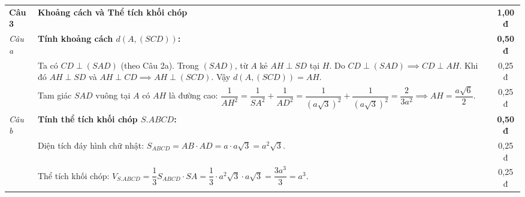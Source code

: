 \documentclass[12pt, a4paper]{article}
\begin{document}
\begin{center}
\begin{tabularx}{\textwidth}{|p{1.5cm}|X|c|}
\textbf{Câu 3} & \textbf{Khoảng cách và Thể tích khối chóp} & \textbf{1,00 đ} \\ \cline{2-3}
\textit{Câu a} & \textbf{Tính khoảng cách $d(A, (SCD))$:} & \textbf{0,50 đ} \\ \cline{2-3}
 & Ta có $CD \perp (SAD)$ (theo Câu 2a). Trong $(SAD)$, từ $A$ kẻ $AH \perp SD$ tại $H$.\newline
 Do $CD \perp (SAD) \implies CD \perp AH$. Khi đó $AH \perp SD$ và $AH \perp CD \implies AH \perp (SCD)$. Vậy $d(A, (SCD)) = AH$. & 0,25 đ \\ \cline{2-3}
 & Tam giác $SAD$ vuông tại $A$ có $AH$ là đường cao:\newline
 $\dfrac{1}{AH^2} = \dfrac{1}{SA^2} + \dfrac{1}{AD^2} = \dfrac{1}{(a\sqrt{3})^2} + \dfrac{1}{(a\sqrt{3})^2} = \dfrac{2}{3a^2} \implies AH = \dfrac{a\sqrt{6}}{2}$. & 0,25 đ \\ \cline{2-3}
\textit{Câu b} & \textbf{Tính thể tích khối chóp $S.ABCD$:} & \textbf{0,50 đ} \\ \cline{2-3}
 & Diện tích đáy hình chữ nhật: $S_{ABCD} = AB \cdot AD = a \cdot a\sqrt{3} = a^2\sqrt{3}$. & 0,25 đ \\ \cline{2-3}
 & Thể tích khối chóp:\newline
 $V_{S.ABCD} = \dfrac{1}{3} S_{ABCD} \cdot SA = \dfrac{1}{3} \cdot a^2\sqrt{3} \cdot a\sqrt{3} = \dfrac{3a^3}{3} = a^3$. & 0,25 đ \\ \hline
\end{tabularx}
\end{center}
\end{document}
